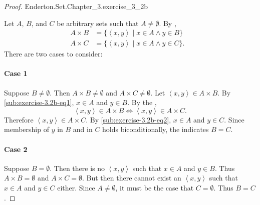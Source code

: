\documentclass{report}
\begin{document}
\begin{proof}

    {Enderton.Set.Chapter\_3.exercise\_3\_2b}

  Let $A$, $B$, and $C$ be arbitrary sets such that $A \neq \emptyset$.
  By ,
    \begin{align}
      A \times B & = \{ \left< x, y \right> \mid x \in A \land y \in B \}
        & \label{sub:exercise-3.2b-eq1} \\
      A \times C & = \{ \left< x, y \right> \mid x \in A \land y \in C \}.
        & \label{sub:exercise-3.2b-eq2}
    \end{align}
  There are two cases to consider:

  \paragraph{Case 1}%

    Suppose $B \neq \emptyset$.
    Then $A \times B \neq \emptyset$ and $A \times C \neq \emptyset$.
    Let $\left< x, y \right> \in A \times B$.
    By \eqref{sub:exercise-3.2b-eq1}, $x \in A$ and $y \in B$.
    By the ,
      $$\left< x, y \right> \in A \times B \iff \left< x, y \right> \in A \times C.$$
    Therefore $\left< x, y \right> \in A \times C$.
    By \eqref{sub:exercise-3.2b-eq2}, $x \in A$ and $y \in C$.
    Since membership of $y$ in $B$ and in $C$ holds biconditionally, the
       indicates $B = C$.

  \paragraph{Case 2}%

    Suppose $B = \emptyset$.
    Then there is no $\left< x, y \right>$ such that $x \in A$ and $y \in B$.
    Thus $A \times B = \emptyset$ and $A \times C = \emptyset$.
    But then there cannot exist an $\left< x, y \right>$ such that $x \in A$
      and $y \in C$ either.
    Since $A \neq \emptyset$, it must be the case that $C = \emptyset$.
    Thus $B = C$.

\end{proof}

\subsection{}%
\label{sub:exercise-3.3}
\end{document}
